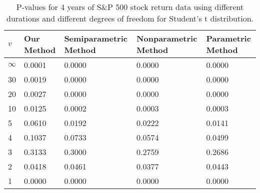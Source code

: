 \begin{table}[ht]
\centering
\caption{P-values for 4 years of S\&P 500 stock return 
                   data using different durations
  and different degrees of freedom for Student's t distribution.} 
\label{table:SP5004}
\begin{tabular}{lllll}
  \hline
$v$ & Our Method & Semiparametric Method & Nonparametric Method & Parametric Method \\ 
  \hline
$\infty$ & 0.0001 & 0.0000 & 0.0000 & 0.0000 \\ 
  30 & 0.0019 & 0.0000 & 0.0000 & 0.0000 \\ 
  20 & 0.0027 & 0.0000 & 0.0000 & 0.0000 \\ 
  10 & 0.0125 & 0.0002 & 0.0003 & 0.0003 \\ 
  5 & 0.0610 & 0.0192 & 0.0222 & 0.0141 \\ 
  4 & 0.1037 & 0.0733 & 0.0574 & 0.0499 \\ 
  3 & 0.3133 & 0.3000 & 0.2759 & 0.2686 \\ 
  2 & 0.0418 & 0.0461 & 0.0377 & 0.0443 \\ 
  1 & 0.0000 & 0.0000 & 0.0000 & 0.0000 \\ 
   \hline
\end{tabular}
\end{table}

